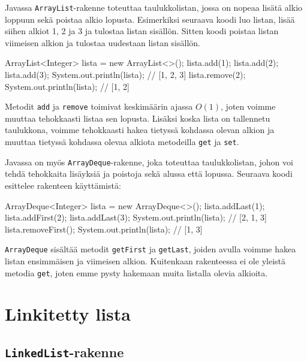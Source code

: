 Javassa \texttt{ArrayList}-rakenne toteuttaa taulukkolistan,
jossa on nopeaa lisätä alkio loppuun sekä poistaa alkio lopusta.
Esimerkiksi seuraava koodi luo listan, lisää siihen alkiot
1, 2 ja 3 ja tulostaa listan sisällön.
Sitten koodi poistaa listan viimeisen alkion ja
tulostaa uudestaan listan sisällön.

\begin{code}
ArrayList<Integer> lista = new ArrayList<>();
lista.add(1);
lista.add(2);
lista.add(3);
System.out.println(lista); // [1, 2, 3]
lista.remove(2);
System.out.println(lista); // [1, 2]
\end{code}

Metodit \texttt{add} ja \texttt{remove}
toimivat keskimäärin ajassa $O(1)$,
joten voimme muuttaa tehokkaasti listaa sen lopusta.
Lisäksi koska lista on tallennetu taulukkona,
voimme tehokkaasti hakea tietyssä kohdassa olevan alkion
ja muuttaa tietyssä kohdassa olevaa alkiota
metodeilla \texttt{get} ja \texttt{set}.

Javassa on myös \texttt{ArrayDeque}-rakenne,
joka toteuttaa taulukkolistan, johon voi tehdä tehokkaita
lisäyksiä ja poistoja sekä alussa että lopussa.
Seuraava koodi esittelee rakenteen käyttämistä:

\begin{code}
ArrayDeque<Integer> lista = new ArrayDeque<>();
lista.addLast(1);
lista.addFirst(2);
lista.addLast(3);
System.out.println(lista); // [2, 1, 3]
lista.removeFirst();
System.out.println(lista); // [1, 3]
\end{code}

\texttt{ArrayDeque} sisältää metodit \texttt{getFirst} ja
\texttt{getLast}, joiden avulla voimme hakea listan
ensimmäisen ja viimeisen alkion.
Kuitenkaan rakenteessa ei ole yleistä metodia \texttt{get},
joten emme pysty hakemaan muita listalla olevia alkioita.


\section{Linkitetty lista}

\subsection{\texttt{LinkedList}-rakenne}

